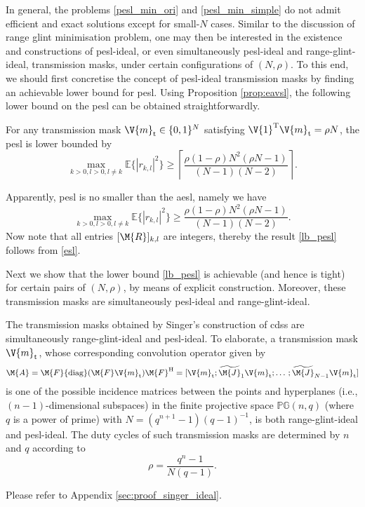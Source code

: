 \documentclass[journal,a4paper,10pt, romanappendices]{IEEEtran}
\begin{document}
In general, the problems \eqref{pesl_min_ori} and \eqref{pesl_min_simple} do not admit efficient and exact solutions except for small-$N$ cases. Similar to the discussion of range glint minimisation problem, one may then be interested in the existence and constructions of \ac{pesl}-ideal, or even simultaneously \ac{pesl}-ideal and range-glint-ideal, transmission masks, under certain configurations of $(N,\rho)$. To this end, we should first concretise the concept of \ac{pesl}-ideal transmission masks by finding an achievable lower bound for \ac{pesl}. Using Proposition \ref{prop:eavsl}, the following lower bound on the \ac{pesl} can be obtained straightforwardly.
\begin{corollary}\label{coro:lb_pesl}
For any transmission mask $\V{m}_{\rm t}\in\{0,1\}^N$ satisfying $\V{1}^{\rm T}\V{m}_{\rm t}=\rho N$, the \ac{pesl} is lower bounded by
\begin{equation}\label{lb_pesl}
\max_{k>0,l>0,l\neq k} \mathbb{E}\{|r_{k,l}|^2\}\geq \left\lceil\frac{\rho(1-\rho)N^2(\rho N-1)}{(N-1)(N-2)}\right\rceil.
\end{equation}
\begin{IEEEproof}
Apparently, \ac{pesl} is no smaller than the \ac{aesl}, namely we have
$$
\max_{k>0,l>0,l\neq k} \mathbb{E}\{|r_{k,l}|^2\}\geq \frac{\rho(1-\rho)N^2(\rho N-1)}{(N-1)(N-2)}.
$$
Now note that all entries $[\M{R}]_{k,l}$ are integers, thereby the result \eqref{lb_pesl} follows from \eqref{esl}.
\end{IEEEproof}
\end{corollary}
Next we show that the lower bound \eqref{lb_pesl} is achievable (and hence is tight) for certain pairs of $(N,\rho)$, by means of explicit construction. Moreover, these transmission masks are simultaneously \ac{pesl}-ideal and range-glint-ideal. 

\begin{proposition}\label{prop:singer_ideal}
The transmission masks obtained by Singer's construction of \acp{cds} \cite{singer1938theorem} are simultaneously range-glint-ideal and \ac{pesl}-ideal. To elaborate, a transmission mask $\V{m}_{\rm t}$, whose corresponding convolution operator given by
\begin{equation}\label{convolution_pg}
\M{A} = \M{F}{\rm diag}(\M{F}\V{m}_{\rm t})\M{F}^{\rm H} = [\V{m}_{\rm t};\widetilde{\M{J}}_1\V{m}_{\rm t};\dotsc;\widetilde{\M{J}}_{N-1}\V{m}_{\rm t}]
\end{equation}
is one of the possible incidence matrices between the points and hyperplanes (i.e., $(n-1)$-dimensional subspaces) in the finite projective space $\mathbb{PG}(n,q)$ (where $q$ is a power of prime) with $N=(q^{n+1}-1)(q-1)^{-1}$, is both range-glint-ideal and \ac{pesl}-ideal. The duty cycles of such transmission masks are determined by $n$ and $q$ according to
\begin{equation}\label{duty_cycle_singer}
\rho = \frac{q^n-1}{N(q-1)}.
\end{equation}
\begin{IEEEproof}
Please refer to Appendix \ref{sec:proof_singer_ideal}.
\end{IEEEproof}
\end{proposition}
\end{document}
